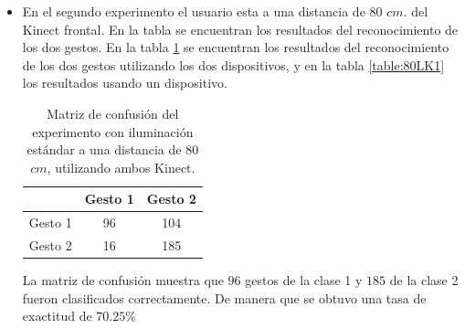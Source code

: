 \begin{itemize}
La matriz de confusión muestra que $127$ gestos de la clase 1 y $194$ de la clase 2 fueron clasificados correctamente. De manera que se obtuvo una tasa de exactitud de $80.25\%$ 

Como se observa en las matrices de confusión, se obtiene una mayor exactitud en el reconocimiento del gesto utilizando dos dispositivos Kinect.


\item En el segundo experimento el usuario esta a una distancia de $80$ $cm.$ del Kinect frontal. En la tabla se encuentran los resultados del reconocimiento de los dos gestos.  En la tabla \ref{table:80LK2} se encuentran los resultados del reconocimiento de los dos gestos utilizando los dos dispositivos, y en la tabla \ref{table:80LK1} los resultados usando un dispositivo.   


\begin{table}[h!] 
\begin{center}
\begin{tabular}{ r || c | c |} 
        & Gesto 1 & Gesto 2 \\ \hline \hline  
Gesto 1 & 96     &  104     \\ \hline  
Gesto 2 & 16     & 185     \\   
\end{tabular}
\end{center} 
\caption{Matriz de confusión del experimento con iluminación estándar a una distancia de $80$ $cm$, utilizando ambos Kinect.} 
\label{table:80LK2}
\end{table}

La matriz de confusión muestra que $96$ gestos de la clase 1 y $185$ de la clase 2 fueron clasificados correctamente. De manera que se obtuvo una tasa de exactitud de $70.25\%$  


\end{itemize}
